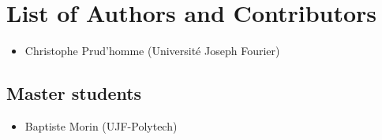 \chapter*{List of Authors and Contributors}

\begin{itemize}
\item
  Christophe Prud'homme (Université Joseph Fourier)
\end{itemize}


\section{Master students}

\begin{itemize}
\item Baptiste Morin (UJF-Polytech)
\end{itemize}

